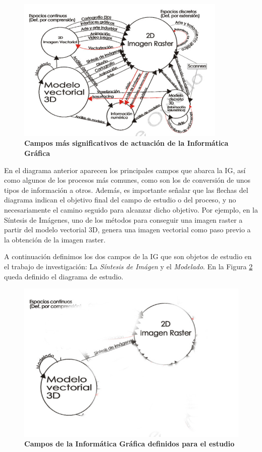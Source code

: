 \begin{figure}[h]
\includegraphics[width=10cm]{Img/CPD/grafica1.jpg}
\centering
\caption{\textbf{\footnotesize{Campos más significativos de actuación de la Informática Gráfica}}}
\label{fig:grafica1}
\end{figure}

En el diagrama anterior aparecen los principales campos que abarca la IG, así como algunos de los procesos más comunes, como son los de conversión de unos tipos de información a otros. Además, es importante señalar que las flechas del diagrama indican el objetivo final del campo de estudio o del proceso, y no necesariamente el camino seguido para alcanzar dicho objetivo. Por ejemplo, en la Síntesis de Imágenes, uno de los métodos para conseguir una imagen raster a partir del modelo vectorial 3D, genera una imagen vectorial como paso previo a la obtención de la imagen raster.

A continuación definimos los dos campos de la IG que son objetos de estudio en el trabajo de investigación: La \textit{Síntesis de Imágen} y el \textit{Modelado}. En la Figura \ref{fig:grafica2} queda definido el diagrama de estudio.



\begin{figure}[h]
\includegraphics[width=14cm]{Img/CPD/grafica2.jpg}
\centering
\caption{\textbf{\footnotesize{Campos de la Informática Gráfica definidos para el estudio}}}
\label{fig:grafica2}
\end{figure}


